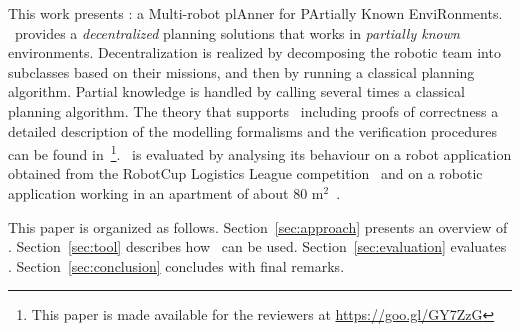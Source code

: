 This work presents  \toolName: a Multi-robot plAnner for PArtially Known EnviRonments.
 \toolName\ provides a  \emph{decentralized} planning solutions that works in \emph{partially known} environments.
 Decentralization is realized by decomposing the robotic team into subclasses based on their missions, and then by running a classical planning algorithm.
Partial knowledge is handled by calling several times  a classical planning algorithm.
The theory that supports \toolName\ including proofs of correctness a detailed description of the modelling formalisms and the verification procedures can be found in~\cite{mapmaker17}\footnote{This paper is made available for the reviewers   at  \url{https://goo.gl/GY7ZzG}}.
\toolName\ is evaluated by analysing its behaviour on a robot application obtained from the RobotCup Logistics League competition~\cite{karrasrobocup} and on a robotic application working in an apartment of about 80 m$^2$~\cite{map}.

This paper is organized as follows. 
Section~\ref{sec:approach} presents an overview of \toolName.
Section~\ref{sec:tool} describes how  \toolName\ can be used.
Section~\ref{sec:evaluation} evaluates  \toolName.
Section~\ref{sec:conclusion} concludes with final remarks.

